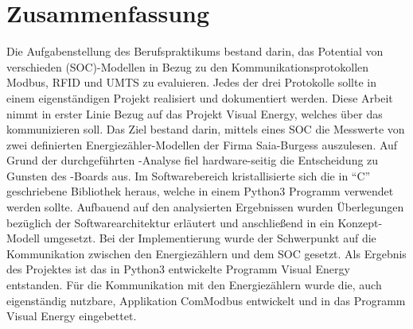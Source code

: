\documentclass[Bachelorarbeit.tex]{subfiles}
\begin{document}
\chapter*{Zusammenfassung}
Die Aufgabenstellung des Berufspraktikums bestand darin, das Potential von verschieden  (SOC)-Modellen in Bezug zu den Kommunikationsprotokollen Modbus, \ac{RFID} und \ac{UMTS} zu evaluieren. Jedes der drei Protokolle sollte in einem eigenständigen Projekt realisiert und dokumentiert werden.  
Diese Arbeit nimmt in erster Linie Bezug auf das Projekt Visual Energy, welches über das   kommunizieren soll. Das Ziel bestand darin, mittels eines \ac{SOC} die Messwerte von zwei definierten Energiezähler-Modellen der Firma Saia-Burgess auszulesen.
Auf Grund der durchgeführten -Analyse fiel hardware-seitig die Entscheidung zu Gunsten des -Boards  aus. Im Softwarebereich kristallisierte sich die in "`C"' geschriebene Bibliothek  heraus, welche in einem Python3 Programm verwendet werden sollte. 
Aufbauend  auf den analysierten Ergebnissen wurden Überlegungen bezüglich der Softwarearchitektur erläutert und anschließend in ein Konzept-Modell umgesetzt. 
Bei der Implementierung  wurde der Schwerpunkt auf die Kommunikation zwischen den Energiezählern und dem \ac{SOC} gesetzt.  
Als Ergebnis des Projektes ist das in Python3 entwickelte Programm Visual Energy entstanden. Für die Kommunikation mit den Energiezählern wurde die, auch eigenständig nutzbare, Applikation ComModbus entwickelt und in das Programm Visual Energy eingebettet.
\end{document}
